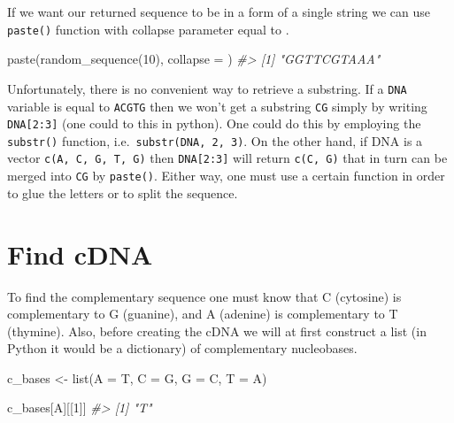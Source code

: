 \documentclass[
]{book}
\newenvironment{Shaded}{\begin{snugshade}}{\end{snugshade}}
\newcommand{\AttributeTok}[1]{\textcolor[rgb]{0.77,0.63,0.00}{#1}}
\newcommand{\CommentTok}[1]{\textcolor[rgb]{0.56,0.35,0.01}{\textit{#1}}}
\newcommand{\DecValTok}[1]{\textcolor[rgb]{0.00,0.00,0.81}{#1}}
\newcommand{\FunctionTok}[1]{\textcolor[rgb]{0.00,0.00,0.00}{#1}}
\newcommand{\NormalTok}[1]{#1}
\newcommand{\OtherTok}[1]{\textcolor[rgb]{0.56,0.35,0.01}{#1}}
\newcommand{\StringTok}[1]{\textcolor[rgb]{0.31,0.60,0.02}{#1}}
\begin{document}
If we want our returned sequence to be in a form of a single string we can use \texttt{paste()} function with collapse parameter equal to \texttt{\textquotesingle{}\textquotesingle{}}.

\begin{Shaded}
\begin{Highlighting}[]
\FunctionTok{paste}\NormalTok{(}\FunctionTok{random\_sequence}\NormalTok{(}\DecValTok{10}\NormalTok{), }\AttributeTok{collapse =} \StringTok{\textquotesingle{}\textquotesingle{}}\NormalTok{)}
\CommentTok{\#\textgreater{} [1] "GGTTCGTAAA"}
\end{Highlighting}
\end{Shaded}

Unfortunately, there is no convenient way to retrieve a substring. If a \texttt{DNA} variable is equal to \texttt{\textquotesingle{}ACGTG\textquotesingle{}} then we won't get a substring \texttt{\textquotesingle{}CG\textquotesingle{}} simply by writing \texttt{DNA{[}2:3{]}} (one could to this in python). One could do this by employing the \texttt{substr()} function, i.e.~\texttt{substr(DNA,\ 2,\ 3)}. On the other hand, if DNA is a vector \texttt{c(\textquotesingle{}A\textquotesingle{},\ \textquotesingle{}C\textquotesingle{},\ \textquotesingle{}G\textquotesingle{},\ \textquotesingle{}T\textquotesingle{},\ \textquotesingle{}G\textquotesingle{})} then \texttt{DNA{[}2:3{]}} will return \texttt{c(\textquotesingle{}C\textquotesingle{},\ \textquotesingle{}G\textquotesingle{})} that in turn can be merged into \texttt{\textquotesingle{}CG\textquotesingle{}} by \texttt{paste()}. Either way, one must use a certain function in order to glue the letters or to split the sequence.

\hypertarget{find-cdna}{%
\section{Find cDNA}\label{find-cdna}}

To find the complementary sequence one must know that C (cytosine) is complementary to G (guanine), and A (adenine) is complementary to T (thymine). Also, before creating the cDNA we will at first construct a list (in Python it would be a dictionary) of complementary nucleobases.

\begin{Shaded}
\begin{Highlighting}[]
\NormalTok{c\_bases }\OtherTok{\textless{}{-}} \FunctionTok{list}\NormalTok{(}\StringTok{\textquotesingle{}A\textquotesingle{}} \OtherTok{=} \StringTok{\textquotesingle{}T\textquotesingle{}}\NormalTok{, }\StringTok{\textquotesingle{}C\textquotesingle{}} \OtherTok{=} \StringTok{\textquotesingle{}G\textquotesingle{}}\NormalTok{, }\StringTok{\textquotesingle{}G\textquotesingle{}} \OtherTok{=} \StringTok{\textquotesingle{}C\textquotesingle{}}\NormalTok{, }\StringTok{\textquotesingle{}T\textquotesingle{}} \OtherTok{=} \StringTok{\textquotesingle{}A\textquotesingle{}}\NormalTok{)}

\NormalTok{c\_bases[}\StringTok{\textquotesingle{}A\textquotesingle{}}\NormalTok{][[}\DecValTok{1}\NormalTok{]]}
\CommentTok{\#\textgreater{} [1] "T"}
\end{Highlighting}
\end{Shaded}
\end{document}
